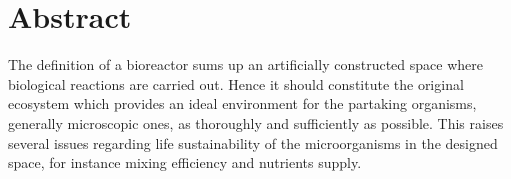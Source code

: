 \chapter*{Abstract}

The definition of a bioreactor sums up an artificially constructed space where biological reactions are carried out. Hence it should constitute the original ecosystem which provides an ideal environment for the partaking organisms, generally microscopic ones, as thoroughly and sufficiently as possible. This raises several issues regarding life sustainability of the microorganisms in the designed space, for instance mixing efficiency and nutrients supply.